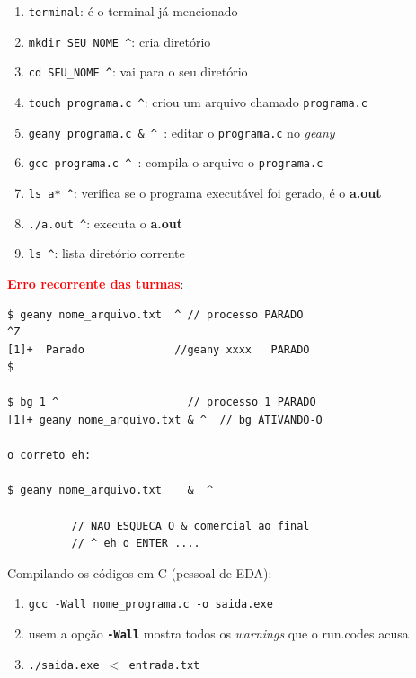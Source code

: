 \documentclass[final,a4paper]{article}
\begin{document}
\begin{description}
\begin{enumerate}
  \item \texttt{terminal}: é o terminal já mencionado
    \item \texttt{mkdir SEU\_NOME \^}: cria diretório
    \item \texttt{cd SEU\_NOME \^}: vai para o seu diretório
    \item \texttt{touch programa.c \^}: criou um arquivo chamado \texttt{programa.c}
    \item \texttt{geany programa.c \& \^ }: editar o \texttt{programa.c} no {\it geany}
     \item \texttt{gcc programa.c \^ }: compila o arquivo o \texttt{programa.c} 
    \item \texttt{ls a* \^}: verifica se o programa executável foi gerado, é o \textbf{a.out}  
    \item  \texttt{./a.out \^}: executa o \textbf{a.out}  
    \item  \texttt{ls \* \^}: lista diretório corrente
       
\end{enumerate}


\pagebreak
\item[\ding{248}] \textcolor{red}{\textbf{Erro recorrente das turmas}}:


\begin{verbatim}
$ geany nome_arquivo.txt  ^ // processo PARADO
^Z
[1]+  Parado              //geany xxxx   PARADO
$

$ bg 1 ^                    // processo 1 PARADO
[1]+ geany nome_arquivo.txt & ^  // bg ATIVANDO-O

o correto eh:

$ geany nome_arquivo.txt    &  ^   
          
          // NAO ESQUECA O & comercial ao final 
          // ^ eh o ENTER ....

\end{verbatim}


\pagebreak
\item[\ding{248}] Compilando os códigos em C (pessoal de EDA):

\begin{enumerate}
  \item \texttt{gcc -Wall  nome\_programa.c -o  saida.exe}
  \item usem a opção \textbf{\texttt{-Wall}}  mostra todos os \textit{warnings} que o run.codes acusa
  \item \texttt{./saida.exe $<$ entrada.txt}
\end{enumerate}





\end{description}
\end{document}
